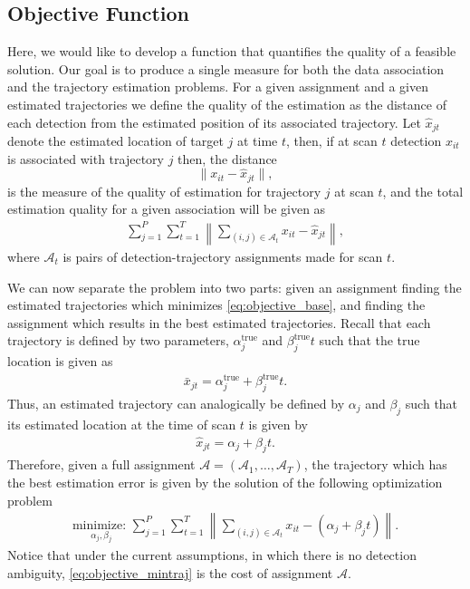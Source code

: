 \subsection{Objective Function}
Here, we would like to develop a function that quantifies the quality of a feasible solution. Our goal is to produce a single measure for both the data association and the trajectory estimation problems. For a given assignment and a given estimated trajectories we define the quality of the estimation as the distance of each detection from the estimated position of its associated trajectory. Let $\hat{x}_{jt}$ denote the estimated location of target $j$ at time $t$, then, if at scan $t$ detection $x_{it}$ is associated with trajectory $j$ then, the distance 
$$\|x_{it}-\hat{x}_{jt}\|,$$
is the measure of the quality of estimation for trajectory $j$ at scan $t$, and the total estimation quality for a given association will be given as 
\begin{align}\label{eq:objective_base}
\sum_{j=1}^P\sum_{t=1}^T\left\|\sum_{(i,j)\in \mathcal{A}_{t}} x_{it} - \hat{x}_{jt}\right\|,
\end{align} 
where $\mathcal{A}_t$ is pairs of detection-trajectory assignments made for scan $t$. 

We can now separate the problem into two parts: given an assignment finding the estimated trajectories which minimizes \eqref{eq:objective_base}, and finding the assignment which results in the best estimated trajectories. Recall that each trajectory is defined by two parameters, $\alpha^{\text{true}}_{j}$ and $\beta^{\text{true}}_{j}t$ such that the true location is given as 
\begin{align}
	\bar{x}_{jt} = \alpha^{\text{true}}_{j} + \beta^{\text{true}}_{j}t.
\end{align}
Thus, an estimated trajectory can analogically be defined by  $\alpha_{j}$ and $\beta_{j}$ such that its estimated location at the time of scan $t$ is given by
\begin{align}
	\hat{x}_{jt} =  \alpha_{j} + \beta_{j}t.
\end{align}
Therefore, given a full assignment  $\mathcal{A}=(\mathcal{A}_1,\ldots,\mathcal{A}_T)$, the trajectory which has the best estimation error is given by the solution of the following optimization problem
\begin{align}\label{eq:objective_mintraj}
\underset{\alpha_{j}, \beta_{j}}{\text{minimize: }}\sum_{j=1}^P\sum_{t=1}^T\left\|\sum_{(i,j)\in \mathcal{A}_{t}} x_{it} - (\alpha_{j} + \beta_{j}t)\right\|.
\end{align} 
Notice that under the current assumptions, in which there is no detection ambiguity, \eqref{eq:objective_mintraj} is the cost of assignment $\mathcal{A}$. 

